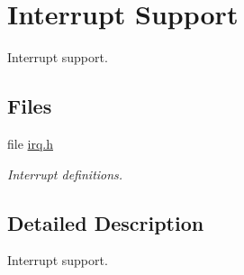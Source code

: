 \hypertarget{group__genmcf548x__interrupt}{}\section{Interrupt Support}
\label{group__genmcf548x__interrupt}


Interrupt support.  


\subsection*{Files}
\begin{DoxyCompactItemize}
\item 
file \mbox{\hyperlink{bsps_2m68k_2genmcf548x_2include_2bsp_2irq_8h}{irq.\+h}}
\begin{DoxyCompactList}\small\item\em Interrupt definitions. \end{DoxyCompactList}\end{DoxyCompactItemize}


\subsection{Detailed Description}
Interrupt support. 

